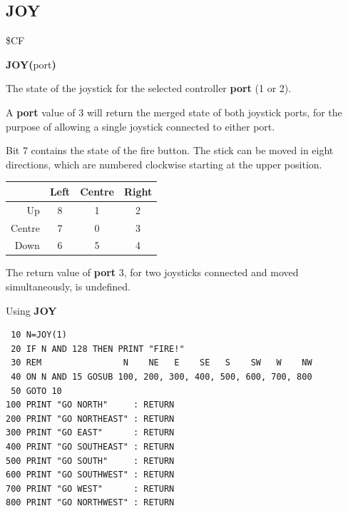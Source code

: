 \subsection{JOY}
\begin{description}[leftmargin=2cm,style=nextline]
\item [Token:]    \$CF

\item [Format:]   {\bf JOY(}port{\bf)}

\item [Returns:]  The state of the joystick for the selected controller {\bf port} (1 or 2).

                  A {\bf port} value of 3 will return the merged state of both joystick ports, for the purpose of allowing a single joystick connected to either port. 

                  Bit 7 contains the state of the fire button. The stick can be moved in eight directions, which are numbered clockwise starting at the upper position.

                  \begin{center}
                  {\setlength{\tabcolsep}{1mm}
                  \begin{tabular}{|r|c|c|c|}
                  \hline
                  &  {\bf Left}  & {\bf Centre} & {\bf Right} \\
                  \hline
                  Up     &  8 &    1  & 2 \\
                  Centre &  7 &    0  & 3 \\
                  Down   &  6 &    5  & 4 \\
                  \hline
                  \end{tabular}
                  }
                  \end{center}

\item [Remarks:]  The return value of {\bf port} 3, for two joysticks connected and moved simultaneously, is undefined.

\item [Example:]  Using {\bf JOY}

\begin{tcolorbox}[colback=black,coltext=white]
\verbatimfont{\codefont}
\begin{verbatim}
 10 N=JOY(1)
 20 IF N AND 128 THEN PRINT "FIRE!"
 30 REM                N    NE   E    SE   S    SW   W    NW
 40 ON N AND 15 GOSUB 100, 200, 300, 400, 500, 600, 700, 800
 50 GOTO 10
100 PRINT "GO NORTH"     : RETURN
200 PRINT "GO NORTHEAST" : RETURN
300 PRINT "GO EAST"      : RETURN
400 PRINT "GO SOUTHEAST" : RETURN
500 PRINT "GO SOUTH"     : RETURN
600 PRINT "GO SOUTHWEST" : RETURN
700 PRINT "GO WEST"      : RETURN
800 PRINT "GO NORTHWEST" : RETURN
\end{verbatim}
\end{tcolorbox}
\end{description}

